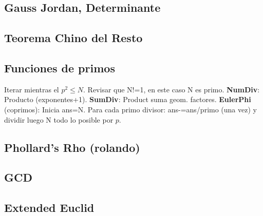\subsection{Gauss Jordan, Determinante}
\subsection{Teorema Chino del Resto}
\subsection{Funciones de primos}
Iterar mientras el $p^2 \leq N$. Revisar que N!=1, en este caso N es primo.
\textbf{NumDiv}: Producto (exponentes+1). \textbf{SumDiv}: Product suma geom. factores. \textbf{EulerPhi} (coprimos): Inicia ans=N. Para cada primo divisor: ans-=ans/primo (una vez) y dividir luego N todo lo posible por $p$. 
\subsection{Phollard's Rho (rolando)}
\subsection{GCD}
\subsection{Extended Euclid}
